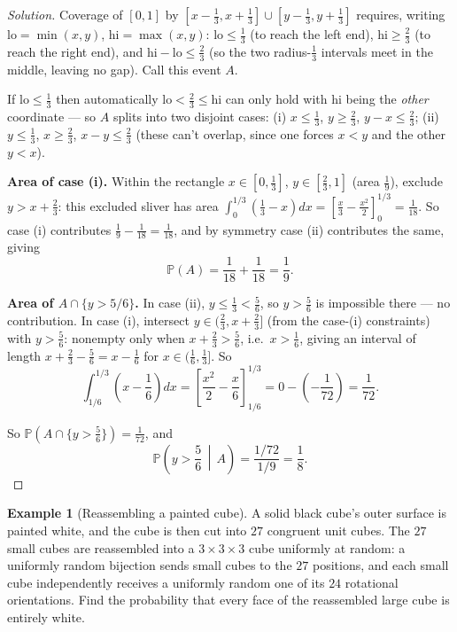 \documentclass[11pt]{article}
\theoremstyle{definition}
\newtheorem{example}{Example}[section]
\begin{document}
\begin{proof}[Solution]
Coverage of $[0,1]$ by $[x-\tfrac13,x+\tfrac13]\cup[y-\tfrac13,y+\tfrac13]$ requires, writing $\mathrm{lo}=\min(x,y)$, $\mathrm{hi}=\max(x,y)$: $\mathrm{lo}\le\tfrac13$ (to reach the left end), $\mathrm{hi}\ge\tfrac23$ (to reach the right end), and $\mathrm{hi}-\mathrm{lo}\le\tfrac23$ (so the two radius-$\tfrac13$ intervals meet in the middle, leaving no gap). Call this event $A$.

If $\mathrm{lo}\le\tfrac13$ then automatically $\mathrm{lo}<\tfrac23\le\mathrm{hi}$ can only hold with $\mathrm{hi}$ being the \emph{other} coordinate — so $A$ splits into two disjoint cases: (i) $x\le\tfrac13$, $y\ge\tfrac23$, $y-x\le\tfrac23$; (ii) $y\le\tfrac13$, $x\ge\tfrac23$, $x-y\le\tfrac23$ (these can't overlap, since one forces $x<y$ and the other $y<x$).

\textbf{Area of case (i).} Within the rectangle $x\in[0,\tfrac13]$, $y\in[\tfrac23,1]$ (area $\tfrac19$), exclude $y>x+\tfrac23$: this excluded sliver has area $\int_0^{1/3}\left(\tfrac13-x\right)dx=\left[\tfrac x3-\tfrac{x^2}2\right]_0^{1/3}=\tfrac1{18}$. So case (i) contributes $\tfrac19-\tfrac1{18}=\tfrac1{18}$, and by symmetry case (ii) contributes the same, giving
\[
\mathbb P(A)=\frac1{18}+\frac1{18}=\frac19.
\]

\textbf{Area of $A\cap\{y>5/6\}$.} In case (ii), $y\le\tfrac13<\tfrac56$, so $y>\tfrac56$ is impossible there — no contribution. In case (i), intersect $y\in(\tfrac23,x+\tfrac23]$ (from the case-(i) constraints) with $y>\tfrac56$: nonempty only when $x+\tfrac23>\tfrac56$, i.e.\ $x>\tfrac16$, giving an interval of length $x+\tfrac23-\tfrac56=x-\tfrac16$ for $x\in(\tfrac16,\tfrac13]$. So
\[
\int_{1/6}^{1/3}\left(x-\frac16\right)dx=\left[\frac{x^2}2-\frac x6\right]_{1/6}^{1/3}=0-\left(-\frac1{72}\right)=\frac1{72}.
\]

So $\mathbb P\!\left(A\cap\{y>\tfrac56\}\right)=\tfrac1{72}$, and
\[
\mathbb P\!\left(y>\frac56 \,\middle|\, A\right)=\frac{1/72}{1/9}=\boxed{\frac18}.
\]
\end{proof}

\begin{example}[Reassembling a painted cube]
A solid black cube's outer surface is painted white, and the cube is then cut into $27$ congruent unit cubes. The $27$ small cubes are reassembled into a $3\times3\times3$ cube uniformly at random: a uniformly random bijection sends small cubes to the $27$ positions, and each small cube independently receives a uniformly random one of its $24$ rotational orientations. Find the probability that every face of the reassembled large cube is entirely white.
\end{example}
\end{document}
